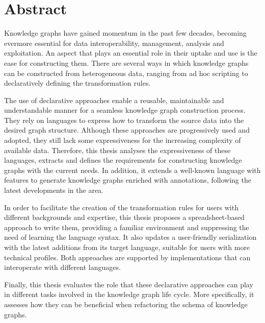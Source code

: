 %

\section*{Abstract}
\label{sec::abstract}




Knowledge graphs have gained momentum in the past few decades, becoming evermore essential for data interoperability, management, analysis and exploitation. 
An aspect that plays an essential role in their uptake and use is the ease for constructing them. 
There are several ways in which knowledge graphs can be constructed from heterogeneous data, ranging from ad hoc scripting to declaratively defining the transformation rules.

The use of declarative approaches enable a reusable, maintainable and understandable manner for a seamless knowledge graph construction process.
They rely on languages to express how to transform the source data into the desired graph structure. 
Although these approaches are progressively used and adopted, they still lack some expressiveness for the increasing complexity of available data. 
Therefore, this thesis analyses the expressiveness of these languages, extracts and defines the requirements for constructing knowledge graphs with the current needs. 
In addition, it extends a well-known language with features to generate knowledge graphs enriched with annotations, following the latest developments in the area.

In order to facilitate the creation of the transformation rules for users with different backgrounds and expertise, this thesis proposes a spreadsheet-based approach to write them, providing a familiar environment and suppressing the need of learning the language syntax.
It also updates a user-friendly serialization with the latest additions from its target language, suitable for users with more technical profiles. 
Both approaches are supported by implementations that can interoperate with different languages. 

Finally, this thesis evaluates the role that these declarative approaches can play in different tasks involved in the knowledge graph life cycle. 
More specifically, it assesses how they can be beneficial when refactoring the schema of knowledge graphs. 

